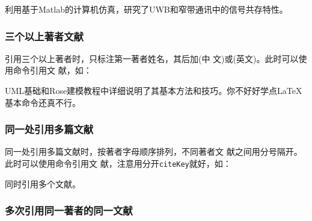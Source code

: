 \begin{center}
  \begin{minipage}[h]{0.9\linewidth}    
    \begin{texdemov}%
利用基于Matlab的计算机仿真\cite{郭文彬2006--}，研究了UWB和窄带通讯中的信号共存特性\cite{Chiani2009-231-254}。%
    \end{texdemov}
  \end{minipage}
\end{center}

\subsubsection{三个以上著者文献}

引用三个以上著者时，只标注第一著者姓名，其后加(中
文)或(英文)。此时可以使用命令引用文
献，如：

\begin{center}
  \begin{minipage}[h]{0.9\linewidth}    
    \begin{texdemov}%
      UML基础和Rose建模教程中详细说明了其基本方法和技巧\cite{蔡敏2006--}。你不好好学点\LaTeX{}基本命令还真不行\cite{r9}。%
    \end{texdemov}
  \end{minipage}
\end{center}

\subsubsection{同一处引用多篇文献}

同一处引用多篇文献时，按著者字母顺序排列，不同著者文
献之间用分号隔开。此时可以使用命令引用文
献，注意用分开\texttt{citeKey}就好，如：

\begin{center}
  \begin{minipage}[h]{0.9\linewidth}    
    \begin{texdemov}%
      同时引用多个文献\cite{r2,r3,r4,r6}。%
    \end{texdemov}
  \end{minipage}
\end{center}
  
\subsubsection{多次引用同一著者的同一文献}


